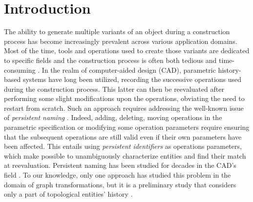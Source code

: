 \section{Introduction}

The ability to generate multiple variants of an object during a construction process has become increasingly prevalent across various application domains. Most of the time, tools and operations used to create those variants are dedicated to specific fields and the construction process is often both tedious and time-consuming \cite{Quattrini_Baleani_2015,haegler2009procedural, muller2006procedural}.  In the realm of computer-aided design (CAD), parametric history-based systems have long been utilized, recording the successive operations used during the construction process. This latter can then be reevaluated after performing some slight modifications upon the operations, obviating the need to restart from scratch.
Such an approach requires addressing the well-known issue of \textit{persistent naming} \cite{KRIPAC1997}.
Indeed, adding, deleting, moving operations in the parametric specification or modifying some operation parameters require ensuring that the subsequent operations are still valid even if their own parameters have been affected. This entails using \emph{persistent identifiers} as operations parameters, which make possible to
unambiguously characterize entities and find their match at
reevaluation.
Persistent naming has been studied for decades in the CAD's
field \cite{KRIPAC1997,CAPOYLEAS199617,wu2001face,wang2005geometry,bidarra2005feature,mun05,mar06,baba10,xue16,farjana2018mechanisms}. 
To our knowledge, only one approach has studied this problem in the domain of graph transformations, but it is a preliminary study that considers only a part of topological entities' history \cite{cardot2019persistent}.

